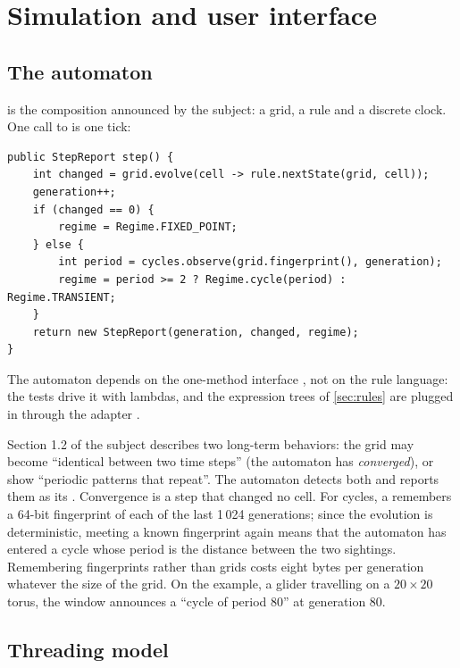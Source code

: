 \section{Simulation and user interface}
\label{sec:simulation}

\subsection{The automaton}

 is the composition announced by the subject: a grid, a rule and a
discrete clock. One call to  is one tick:

\begin{lstlisting}
public StepReport step() {
    int changed = grid.evolve(cell -> rule.nextState(grid, cell));
    generation++;
    if (changed == 0) {
        regime = Regime.FIXED_POINT;
    } else {
        int period = cycles.observe(grid.fingerprint(), generation);
        regime = period >= 2 ? Regime.cycle(period) : Regime.TRANSIENT;
    }
    return new StepReport(generation, changed, regime);
}
\end{lstlisting}

The automaton depends on the one-method interface , not on the rule language: the
tests drive it with lambdas, and the expression trees of \cref{sec:rules} are plugged in through
the adapter .

Section 1.2 of the subject describes two long-term behaviors: the grid may become ``identical
between two time steps'' (the automaton has \emph{converged}), or show ``periodic patterns that
repeat''. The automaton detects both and reports them as its . Convergence is a step
that changed no cell. For cycles, a  remembers a 64-bit fingerprint of each
of the last 1\,024 generations; since the evolution is deterministic, meeting a known fingerprint
again means that the automaton has entered a cycle whose period is the distance between the two
sightings. Remembering fingerprints rather than grids costs eight bytes per generation whatever
the size of the grid. On the  example, a glider travelling on a
$20 \times 20$ torus, the window announces a ``cycle of period 80'' at generation 80.

\subsection{Threading model}

